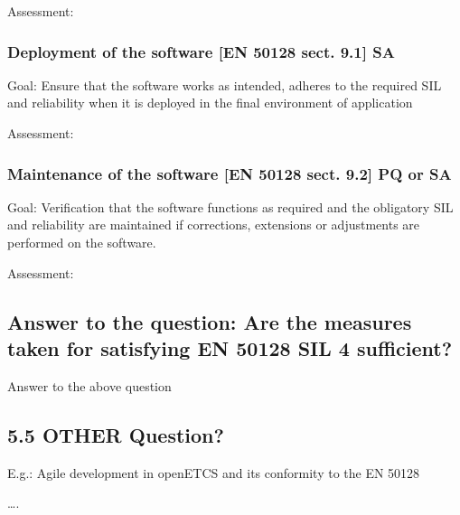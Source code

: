 \bigskip


\bigskip


\bigskip

Assessment:


\bigskip


\bigskip

\subsubsection{Deployment of the software [EN 50128
sect. 9.1] SA}
Goal: Ensure that the software works as intended, adheres to the required SIL and reliability when it is deployed in the
final environment of application


\bigskip


\bigskip

Assessment:


\bigskip


\bigskip

\subsubsection{Maintenance of the software [EN 50128 sect. 9.2] PQ or SA}
Goal: Verification that the software functions as required and the obligatory SIL and reliability are maintained if
corrections, extensions or adjustments are performed on the software.


\bigskip


\bigskip

Assessment:


\bigskip

\subsection{Answer to the question: \newline
Are the measures taken for satisfying EN 50128 SIL 4 sufficient?}
Answer to the above question

\subsection{5.5 OTHER Question?}
{\textbullet} E.g.: Agile development in openETCS and its conformity to the EN 50128 

{\textbullet} {\dots}.
